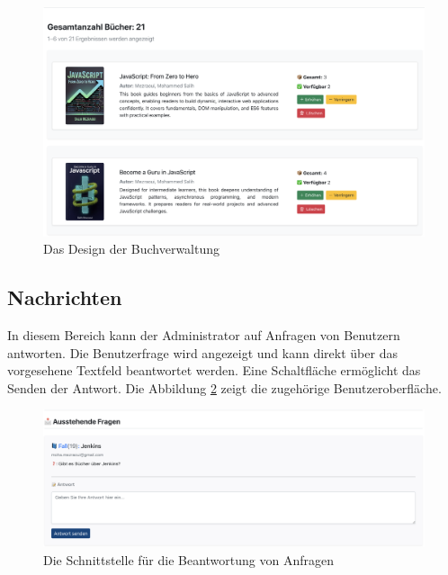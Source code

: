 \begin{figure}[H]
	\centering
	\includegraphics[width=1.0\textwidth]{images/UI-screenshots/Manage-Books.png}
	\caption{Das Design der Buchverwaltung}
	\label{fig:Manage-Books}
\end{figure}
\subsection{Nachrichten}

\noindent In diesem Bereich kann der Administrator auf Anfragen von Benutzern antworten. Die Benutzerfrage wird angezeigt und kann direkt über das vorgesehene Textfeld beantwortet werden. Eine Schaltfläche ermöglicht das Senden der Antwort. Die Abbildung \ref{fig:Messages-Responses} zeigt die zugehörige Benutzeroberfläche.

\begin{figure}[H]
	\centering
	\includegraphics[width=1.0\textwidth]{images/UI-screenshots/Messages-Responses.png}
	\caption{Die Schnittstelle für die Beantwortung von Anfragen}
	\label{fig:Messages-Responses}
\end{figure}




















